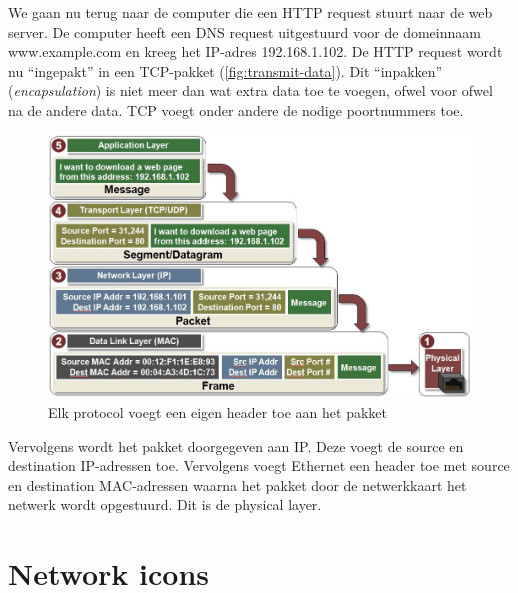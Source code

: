 We gaan nu terug naar de computer die een HTTP request stuurt naar de web server.
De computer heeft een DNS request uitgestuurd voor de domeinnaam www.example.com en kreeg het IP-adres 192.168.1.102.
De HTTP request wordt nu ``ingepakt'' in een TCP-pakket (\vref{fig:transmit-data}).
Dit ``inpakken'' (\emph{encapsulation}) is niet meer dan wat extra data toe te voegen, ofwel voor ofwel na de andere data.
TCP voegt onder andere de nodige poortnummers toe.


\begin{figure}
   \centering
   \includegraphics[width=\textwidth]{images/transmit_data.jpg}
   \caption{Elk protocol voegt een eigen header toe aan het pakket}
   \label{fig:transmit-data}
\end{figure}

Vervolgens wordt het pakket doorgegeven aan IP.
Deze voegt de source en destination IP-adressen toe.
Vervolgens voegt Ethernet een header toe met source en destination MAC-adressen waarna het pakket door de netwerkkaart het netwerk wordt opgestuurd.
Dit is de physical layer.


%




\section{Network icons}
